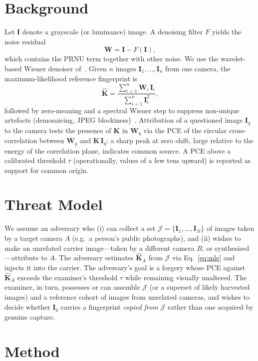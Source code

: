 \documentclass[11pt]{article}
\newcommand{\K}{\mathbf{K}}
\newcommand{\I}{\mathbf{I}}
\newcommand{\W}{\mathbf{W}}
\begin{document}
\section{Background}
\label{sec:background}
Let $\I$ denote a grayscale (or luminance) image. A denoising filter $F$ yields
the noise residual
\begin{equation}
  \W = \I - F(\I),
\end{equation}
which contains the PRNU term together with other noise. We use the wavelet-based
Wiener denoiser of~\cite{lukas2006}. Given $n$ images $\I_1,\dots,\I_n$ from one
camera, the maximum-likelihood reference fingerprint is
\begin{equation}
  \hat{\K} = \frac{\sum_{i=1}^{n} \W_i \, \I_i}{\sum_{i=1}^{n} \I_i^2},
  \label{eq:mle}
\end{equation}
followed by zero-meaning and a spectral Wiener step to suppress non-unique
artefacts (demosaicing, JPEG blockiness)~\cite{chen2008}. Attribution of a
questioned image $\I_q$ to the camera tests the presence of $\K$ in $\W_q$ via
the PCE of the circular cross-correlation between $\W_q$ and $\K\,\I_q$: a sharp
peak at zero shift, large relative to the energy of the correlation plane,
indicates common source. A PCE above a calibrated threshold $\tau$
(operationally, values of a few tens upward) is reported as support for common
origin.

\section{Threat Model}
We assume an adversary who (i) can collect a set $\mathcal{J}=\{\I_1,\dots,\I_N\}$
of images taken by a target camera $A$ (e.g.\ a person's public photographs),
and (ii) wishes to make an unrelated carrier image---taken by a different camera
$B$, or synthesised---attribute to $A$. The adversary estimates $\hat{\K}_A$ from
$\mathcal{J}$ via Eq.~\eqref{eq:mle} and injects it into the carrier. The
adversary's goal is a forgery whose PCE against $\hat{\K}_A$ exceeds the
examiner's threshold $\tau$ while remaining visually unaltered. The examiner, in
turn, possesses or can assemble $\mathcal{J}$ (or a superset of likely harvested
images) and a reference cohort of images from unrelated cameras, and wishes to
decide whether $\I_q$ carries a fingerprint \emph{copied from} $\mathcal{J}$
rather than one acquired by genuine capture.

\section{Method}
\end{document}
